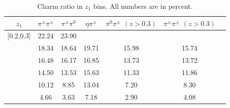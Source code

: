 \begin{table}[H]\footnotesize
\centering
\begin{tabular}{|c||c|c|c|c|c|c|}
\hline
$z_1$ & $\pi^{\pm}\pi^{\pm}$ & $\pi^{\pm}\pi^0$ & $\eta\pi^{\pm}$ & $\pi^0\pi^{\pm}$ $(z>0.3)$ & $\pi^{\pm}\pi^{\pm}$ $(z>0.3)$ \\ \hline\hline
[0.2,0.3]	&	22.24	&	23.90	&		&		&		\\ \hline
[0.3,0.4]	&	18.34	&	18.64	&	19.71	&	15.98	&	15.74	\\ \hline
[0.4,0.5]	&	16.48	&	16.17	&	16.85	&	13.73	&	13.72	\\ \hline
[0.5,0.6]	&	14.50	&	13.53	&	15.63	&	11.33	&	11.86	\\ \hline
[0.6,0.7]	&	10.12	&	8.85	&	13.04	&	7.20	&	8.30	\\ \hline
[0.7,1.0]	&	4.66	&	3.63	&	7.18	&	2.90	&	4.08	\\ \hline\end{tabular}
\caption[Charm ratio in $z_1$ bins]{Charm ratio in $z_1$ bins. All numbers are in percent.}
\label{tab:sinzcharmratio}
\end{table}


